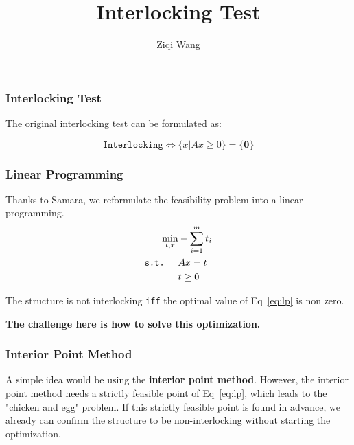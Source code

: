 \documentclass{beamer}
\title{Interlocking Test}
\author{Ziqi Wang}
\begin{document}
\frame{\titlepage}




\begin{frame}
\frametitle{Interlocking Test}
The original interlocking test can be formulated as:\par
\begin{equation*}
\texttt{Interlocking}  \iff  \{x | Ax \geq 0\} = \{\mathbf{0}\} 
\end{equation*}
\end{frame}


\begin{frame}
\frametitle{Linear Programming}
Thanks to Samara, we reformulate the feasibility problem into a linear programming.
\begin{equation}
\begin{aligned}
\min_{t, x}& -\sum_{i=1}^{m} t_i \\
\texttt{s.t.} \hspace{0.5cm} & Ax = t \\
& t \geq 0
\end{aligned}
\label{eq:lp}
\end{equation}\par
The structure is not interlocking \texttt{iff} the optimal value of Eq~\ref{eq:lp} is non zero. \pause \par
\vspace{1cm}\textbf{The challenge here is how to solve this optimization.}
\end{frame}

\begin{frame}
\frametitle{Interior Point Method}
A simple idea would be using the \textbf{interior point method}. However, the interior point method needs a strictly feasible point of Eq~\ref{eq:lp}, which leads to the "chicken and egg" problem. If this strictly feasible point is found in advance, we already can confirm the structure to be non-interlocking without starting the optimization.
\end{frame}
\end{document}
